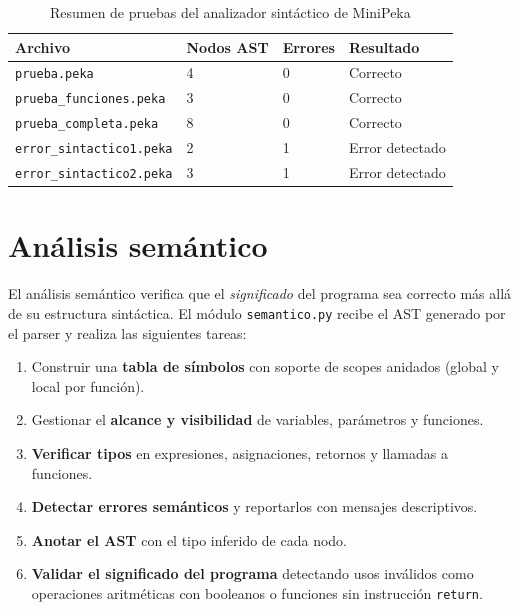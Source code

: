\documentclass[12pt]{article}
\begin{document}
\begin{table}[H]
\centering
\renewcommand{\arraystretch}{1.25}
\begin{tabular}{@{}p{5.5cm} p{2.5cm} p{2.0cm} p{3.0cm}@{}}
\toprule
\textbf{Archivo} & \textbf{Nodos AST} &
\textbf{Errores} & \textbf{Resultado} \\
\midrule
\texttt{prueba.peka}              & 4 & 0 & Correcto \\
\texttt{prueba\_funciones.peka}   & 3 & 0 & Correcto \\
\texttt{prueba\_completa.peka}    & 8 & 0 & Correcto \\
\texttt{error\_sintactico1.peka}  & 2 & 1 & Error detectado \\
\texttt{error\_sintactico2.peka}  & 3 & 1 & Error detectado \\
\bottomrule
\end{tabular}
\caption{Resumen de pruebas del analizador sintáctico de MiniPeka}
\end{table}

\section{Análisis semántico}

El análisis semántico verifica que el \textit{significado} del programa
sea correcto más allá de su estructura sintáctica. El módulo
\texttt{semantico.py} recibe el AST generado por el parser y realiza
las siguientes tareas:

\begin{enumerate}
    \item Construir una \textbf{tabla de símbolos} con soporte de
          scopes anidados (global y local por función).
    \item Gestionar el \textbf{alcance y visibilidad} de variables,
          parámetros y funciones.
    \item \textbf{Verificar tipos} en expresiones, asignaciones,
          retornos y llamadas a funciones.
    \item \textbf{Detectar errores semánticos} y reportarlos con
          mensajes descriptivos.
    \item \textbf{Anotar el AST} con el tipo inferido de cada nodo.
    \item \textbf{Validar el significado del programa} detectando
          usos inválidos como operaciones aritméticas con booleanos
          o funciones sin instrucción \texttt{return}.
\end{enumerate}
\end{document}

